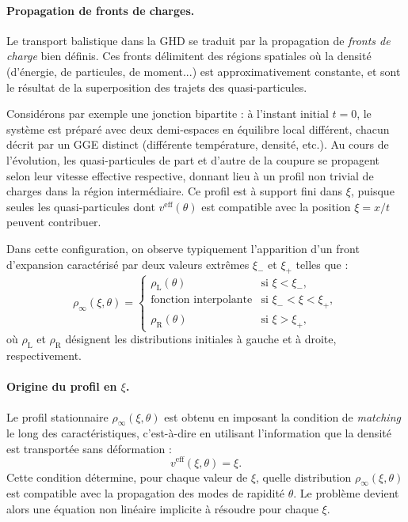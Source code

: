 \paragraph{Propagation de fronts de charges.}
Le transport balistique dans la GHD se traduit par la propagation de \emph{fronts de charge} bien définis. Ces fronts délimitent des régions spatiales où la densité (d'énergie, de particules, de moment...) est approximativement constante, et sont le résultat de la superposition des trajets des quasi-particules.

Considérons par exemple une jonction bipartite : à l’instant initial $t=0$, le système est préparé avec deux demi-espaces en équilibre local différent, chacun décrit par un GGE distinct (différente température, densité, etc.). Au cours de l’évolution, les quasi-particules de part et d’autre de la coupure se propagent selon leur vitesse effective respective, donnant lieu à un profil non trivial de charges dans la région intermédiaire. Ce profil est à support fini dans $\xi$, puisque seules les quasi-particules dont $v^{\mathrm{eff}}(\theta)$ est compatible avec la position $\xi = x/t$ peuvent contribuer.

Dans cette configuration, on observe typiquement l’apparition d’un front d’expansion caractérisé par deux valeurs extrêmes $\xi_-$ et $\xi_+$ telles que :
\[
\rho_\infty(\xi,\theta) = 
\begin{cases}
\rho_{\mathrm{L}}(\theta) & \text{si } \xi < \xi_-, \\
\text{fonction interpolante} & \text{si } \xi_- < \xi < \xi_+, \\
\rho_{\mathrm{R}}(\theta) & \text{si } \xi > \xi_+,
\end{cases}
\]
où $\rho_{\mathrm{L}}$ et $\rho_{\mathrm{R}}$ désignent les distributions initiales à gauche et à droite, respectivement.

\paragraph{Origine du profil en $\xi$.}
Le profil stationnaire $\rho_\infty(\xi,\theta)$ est obtenu en imposant la condition de \emph{matching} le long des caractéristiques, c’est-à-dire en utilisant l’information que la densité est transportée sans déformation :
\[
v^{\mathrm{eff}}(\xi,\theta) = \xi.
\]
Cette condition détermine, pour chaque valeur de $\xi$, quelle distribution $\rho_\infty(\xi,\theta)$ est compatible avec la propagation des modes de rapidité $\theta$. Le problème devient alors une équation non linéaire implicite à résoudre pour chaque $\xi$.

